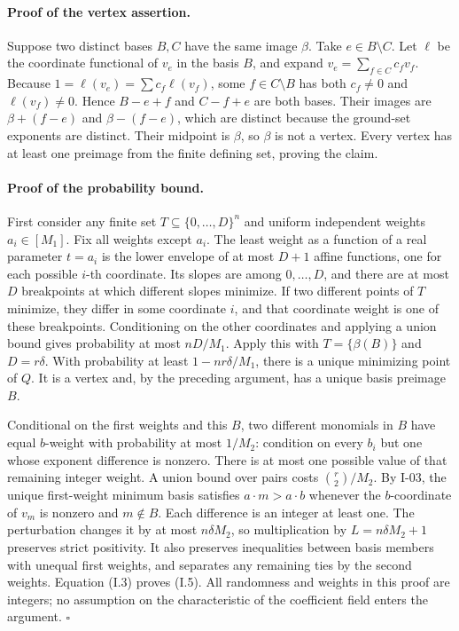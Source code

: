 \documentclass[11pt,a4paper]{article}
\theoremstyle{definition}\newtheorem{definition}{Definition}
\begin{document}
\paragraph{Proof of the vertex assertion.}
Suppose two distinct bases $B,C$ have the same image $\beta$.
Take $e\in B\setminus C$.  Let $\ell$ be the coordinate functional
of $v_e$ in the basis $B$, and expand $v_e=\sum_{f\in C}c_fv_f$.
Because $1=\ell(v_e)=\sum c_f\ell(v_f)$, some
$f\in C\setminus B$ has both $c_f\ne0$ and $\ell(v_f)\ne0$.
Hence $B-e+f$ and $C-f+e$ are both bases.  Their images are
$\beta+(f-e)$ and $\beta-(f-e)$, which are distinct because the
ground-set exponents are distinct.  Their midpoint is $\beta$,
so $\beta$ is not a vertex.  Every vertex has at least one preimage
from the finite defining set, proving the claim.

\paragraph{Proof of the probability bound.}
First consider any finite set $T\subseteq\{0,\ldots,D\}^{n}$ and
uniform independent weights $a_i\in[M_1]$.  Fix all weights except
$a_i$.  The least weight as a function of a real parameter $t=a_i$
is the lower envelope of at most $D+1$ affine functions, one for
each possible $i$-th coordinate.  Its slopes are among
$0,\ldots,D$, and there are at most $D$ breakpoints at which
different slopes minimize.  If two different points of $T$ minimize,
they differ in some coordinate $i$, and that coordinate weight is
one of these breakpoints.  Conditioning on the other coordinates
and applying a union bound gives probability at most $nD/M_1$.
Apply this with $T=\{\beta(B)\}$ and $D=r\delta$.
With probability at least $1-nr\delta/M_1$, there is a unique
minimizing point of $Q$.  It is a vertex and, by the preceding
argument, has a unique basis preimage $B$.

Conditional on the first weights and this $B$, two different
monomials in $B$ have equal $b$-weight with probability at most
$1/M_2$: condition on every $b_i$ but one whose exponent difference
is nonzero.  There is at most one possible value of that remaining
integer weight.  A union bound over pairs costs
$\binom r2/M_2$.  By I-03, the unique first-weight minimum basis
satisfies $a\cdot m>a\cdot b$ whenever the $b$-coordinate of
$v_m$ is nonzero and $m\notin B$.  Each difference is an integer
at least one.  The perturbation changes it by at most
$n\delta M_2$, so multiplication by $L=n\delta M_2+1$ preserves
strict positivity.  It also preserves inequalities between basis
members with unequal first weights, and separates any remaining
ties by the second weights.  Equation (I.3) proves (I.5).
All randomness and weights in this proof are integers; no assumption
on the characteristic of the coefficient field enters the argument.
\hfill$\square$
\end{document}
